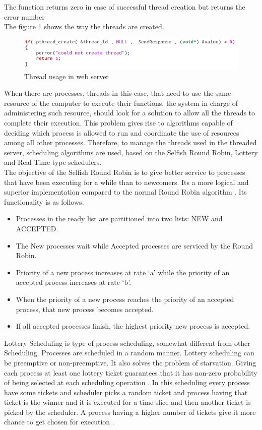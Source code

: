 \documentclass{article}
\begin{document}
The function returns zero in case of successful thread creation but returns the error number
\\The figure \ref{fig:intThread} shows the way the threads are created.
\begin{figure}[H]
	\centering
	\captionsetup{justification=centering, margin=1cm}
    \includegraphics[width = \columnwidth]{intThread.png}
    \caption{Thread usage in web server}
	\label{fig:intThread}
\end{figure}

When there are processes, threads in this case, that need to use the same resource of the computer to execute their functions, the system in charge of administering such resource, should look for a solution to allow all the threads to complete their execution. This problem gives rise to algorithms capable of deciding which process is allowed to run and coordinate the use of resources among all other processes. Therefore, to manage the threads used in the threaded server, scheduling algorithms are used, based on the Selfish Round Robin, Lottery and Real Time type schedulers.\\
The objective of the Selfish Round Robin is to give better service to processes that have been executing for a while than to newcomers. Its a more logical and superior implementation compared to the normal Round Robin algorithm \cite{SRR}. Its functionality is as follows:
\begin{itemize}
    \item Processes in the ready list are partitioned into two lists: NEW and ACCEPTED.
    \item The New processes wait while Accepted processes are serviced by the Round Robin.
    \item Priority of a new process increases at rate ‘a’ while the priority of an accepted process increases at rate ‘b’.
    \item When the priority of a new process reaches the priority of an accepted process, that new process becomes accepted.
    \item If all accepted processes finish, the highest priority new process is accepted.
\end{itemize}
Lottery Scheduling is type of process scheduling, somewhat different from other Scheduling. Processes are scheduled in a random manner. Lottery scheduling can be preemptive or non-preemptive. It also solves the problem of starvation. Giving each process at least one lottery ticket guarantees that it has non-zero probability of being selected at each scheduling operation \cite{Lottery}. In this scheduling every process have some tickets and scheduler picks a random ticket and process having that ticket is the winner and it is executed for a time slice and then another ticket is picked by the scheduler. A process having a higher number of tickets give it more chance to get chosen for execution \cite{Lottery}.\\
\end{document}

